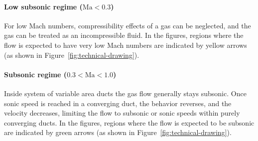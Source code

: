 	\paragraph{Low subsonic regime ($\mathrm{Ma} < 0.3$)}
		For low Mach numbers, compressibility effects of a gas can be neglected, and the gas can be treated as an incompressible fluid.
		In the figures, regions where the flow is expected to have very low Mach numbers are indicated by yellow arrows (as shown in Figure~\ref{fig:technical-drawing}).

	\paragraph{Subsonic regime ($0.3 < \mathrm{Ma} < 1.0$)} 
		Inside system of variable area ducts the gas flow generally stays subsonic.
		Once sonic speed is reached in a converging duct, the behavior reverses, and the velocity decreases, limiting the flow to subsonic or sonic speeds within purely converging ducts.
		In the figures, regions where the flow is expected to be subsonic are indicated by green arrows (as shown in Figure~\ref{fig:technical-drawing}).\\
